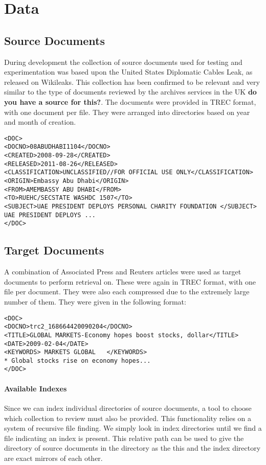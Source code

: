 \section{Data}
\subsection{Source Documents}
During development the collection of source documents used for testing and experimentation was based upon the United States Diplomatic Cables Leak, as released on Wikileaks. This collection has been confirmed to be relevant and very similar to the type of documents reviewed by the archives services in the UK \textbf{do you have a source for this?}. The documents were provided in TREC format, with one document per file. They were arranged into directories based on year and month of creation.
\begin{verbatim}
<DOC>
<DOCNO>08ABUDHABI1104</DOCNO>
<CREATED>2008-09-28</CREATED>
<RELEASED>2011-08-26</RELEASED>
<CLASSIFICATION>UNCLASSIFIED//FOR OFFICIAL USE ONLY</CLASSIFICATION>
<ORIGIN>Embassy Abu Dhabi</ORIGIN>
<FROM>AMEMBASSY ABU DHABI</FROM>
<TO>RUEHC/SECSTATE WASHDC 1507</TO>
<SUBJECT>UAE PRESIDENT DEPLOYS PERSONAL CHARITY FOUNDATION </SUBJECT>
UAE PRESIDENT DEPLOYS ...
</DOC>
\end{verbatim}
\subsection{Target Documents}
A combination of Associated Press and Reuters articles were used as target documents to perform retrieval on. These were again in TREC format, with one file per document. They were also each compressed due to the extremely large number of them.
They were given in the following format:
\begin{verbatim}
<DOC>
<DOCNO>trc2_168664420090204</DOCNO>
<TITLE>GLOBAL MARKETS-Economy hopes boost stocks, dollar</TITLE>
<DATE>2009-02-04</DATE>
<KEYWORDS> MARKETS GLOBAL   </KEYWORDS>
* Global stocks rise on economy hopes...
</DOC>
\end{verbatim}



\paragraph{Available Indexes}
Since we can index individual directories of source documents, a tool to choose which collection to review must also be provided. This functionality relies on a system of recursive file finding. We simply look in index directories until we find a  file indicating an index is present. This relative path can be used to give the directory of source documents in the  directory as the this and the index directory are exact mirrors of each other.


